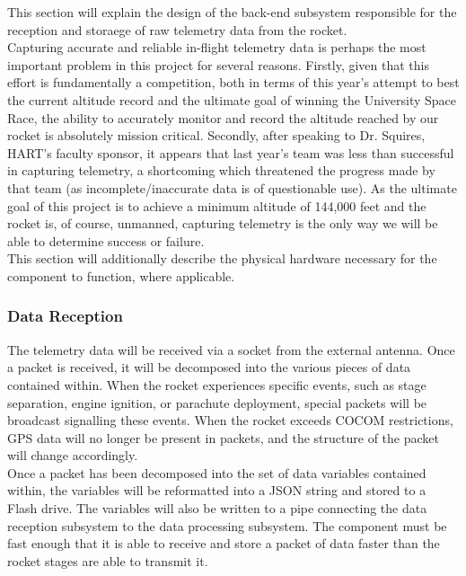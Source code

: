 \documentclass[onecolumn, draftclsnofoot,10pt, compsoc]{IEEEtran}
\begin{document}
This section will explain the design of the back-end subsystem responsible for the reception and storaege of raw telemetry data from the rocket.\\
\noindent
Capturing accurate and reliable in-flight telemetry data is perhaps the most important problem in this project for several reasons. 
Firstly, given that this effort is fundamentally a competition, both in terms of this year's attempt to best the current altitude record and the ultimate goal of winning the University Space Race, the ability to accurately monitor and record the altitude reached by our rocket is absolutely mission critical. 
Secondly, after speaking to Dr. Squires, HART's faculty sponsor, it appears that last year's team was less than successful in capturing telemetry, a shortcoming which threatened the progress made by that team (as incomplete/inaccurate data is of questionable use). 
As the ultimate goal of this project is to achieve a minimum altitude of 144,000 feet and the rocket is, of course, unmanned, capturing telemetry is the only way we will be able to determine success or failure.\\
\noindent
This section will additionally describe the physical hardware necessary for the component to function, where applicable.

\subsubsection{Data Reception}

The telemetry data will be received via a socket from the external antenna.
Once a packet is received, it will be decomposed into the various pieces of data contained within.
When the rocket experiences specific events, such as stage separation, engine ignition, or parachute deployment, special packets will be broadcast signalling these events.
When the rocket exceeds COCOM restrictions, GPS data will no longer be present in packets, and the structure of the packet will change accordingly.\\
\noindent
Once a packet has been decomposed into the set of data variables contained within, the variables will be reformatted into a JSON string and stored to a Flash drive.
The variables will also be written to a pipe connecting the data reception subsystem to the data processing subsystem.
The component must be fast enough that it is able to receive and store a packet of data faster than the rocket stages are able to transmit it.
\end{document}
